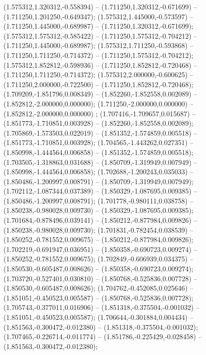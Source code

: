  (1.575312,1.320312,-0.558394) -- (1.711250,1.320312,-0.671699) -- (1.711250,1.201250,-0.649347);
 (1.575312,1.445000,-0.573597) -- (1.711250,1.445000,-0.689987) -- (1.711250,1.320312,-0.671699);
 (1.575312,1.575312,-0.585422) -- (1.711250,1.575312,-0.704212) -- (1.711250,1.445000,-0.689987);
 (1.575312,1.711250,-0.593868) -- (1.711250,1.711250,-0.714372) -- (1.711250,1.575312,-0.704212);
 (1.575312,1.852812,-0.598936) -- (1.711250,1.852812,-0.720468) -- (1.711250,1.711250,-0.714372);
 (1.575312,2.000000,-0.600625) -- (1.711250,2.000000,-0.722500) -- (1.711250,1.852812,-0.720468);
 (1.709209,-1.851796,0.008349) -- (1.852260,-1.852558,0.002089) -- (1.852812,-2.000000,0.000000);
 (1.711250,-2.000000,0.000000) -- (1.852812,-2.000000,0.000000) ;
 (1.707416,-1.709657,0.015687) -- (1.851773,-1.710851,0.003928) -- (1.852260,-1.852558,0.002089);
 (1.705869,-1.573503,0.022019) -- (1.851352,-1.574859,0.005518) -- (1.851773,-1.710851,0.003928);
 (1.704565,-1.443262,0.027351) -- (1.850998,-1.444564,0.006858) -- (1.851352,-1.574859,0.005518);
 (1.703505,-1.318863,0.031688) -- (1.850709,-1.319949,0.007949) -- (1.850998,-1.444564,0.006858);
 (1.702688,-1.200243,0.035033) -- (1.850486,-1.200997,0.008791) -- (1.850709,-1.319949,0.007949);
 (1.702112,-1.087344,0.037389) -- (1.850329,-1.087695,0.009385) -- (1.850486,-1.200997,0.008791);
 (1.701778,-0.980111,0.038758) -- (1.850238,-0.980028,0.009730) -- (1.850329,-1.087695,0.009385);
 (1.701684,-0.878496,0.039141) -- (1.850212,-0.877984,0.009826) -- (1.850238,-0.980028,0.009730);
 (1.701831,-0.782454,0.038539) -- (1.850252,-0.781552,0.009675) -- (1.850212,-0.877984,0.009826);
 (1.702219,-0.691947,0.036951) -- (1.850358,-0.690723,0.009274) -- (1.850252,-0.781552,0.009675);
 (1.702849,-0.606939,0.034375) -- (1.850530,-0.605487,0.008626) -- (1.850358,-0.690723,0.009274);
 (1.703720,-0.527401,0.030810) -- (1.850768,-0.525836,0.007728) -- (1.850530,-0.605487,0.008626);
 (1.704762,-0.452085,0.025646) -- (1.851051,-0.450523,0.005587) -- (1.850768,-0.525836,0.007728);
 (1.705743,-0.377011,0.016906) -- (1.851318,-0.375504,-0.001032) -- (1.851051,-0.450523,0.005587);
 (1.706644,-0.301884,0.004434) -- (1.851563,-0.300472,-0.012380) -- (1.851318,-0.375504,-0.001032);
 (1.707465,-0.226714,-0.011774) -- (1.851786,-0.225429,-0.028458) -- (1.851563,-0.300472,-0.012380);

